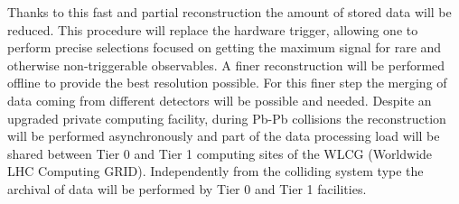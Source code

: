Thanks to this fast and partial reconstruction the amount of stored data will be reduced.
This procedure will replace the hardware trigger, allowing one to perform precise selections focused on getting the maximum signal for rare and otherwise non-triggerable observables.
A finer reconstruction will be performed offline to provide the best resolution possible.
For this finer step the merging of data coming from different detectors will be possible and needed.
Despite an upgraded private computing facility, during Pb-Pb collisions the reconstruction will be performed asynchronously and part of the data processing load will be shared between Tier 0 and Tier 1 computing sites of the WLCG (Worldwide LHC Computing GRID).
Independently from the colliding system type the archival of data will be performed by Tier 0 and Tier 1 facilities.

